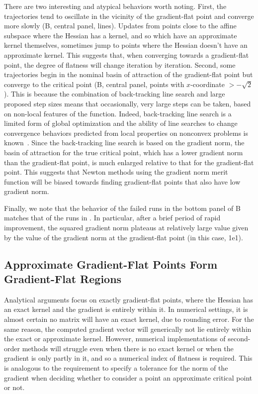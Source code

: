 \documentclass[../../thesis.tex]{subfiles}
\begin{document}
There are two interesting and atypical behaviors worth noting.
First, the trajectories tend to oscillate
in the vicinity of the gradient-flat point
and converge more slowly
(B, central panel, \failcolor{} lines).
Updates from points close to the affine subspace where the Hessian has a kernel,
and so which have an approximate kernel themselves,
sometimes jump to points where the Hessian doesn't have an approximate kernel.
This suggests that, when converging towards a gradient-flat point,
the degree of flatness will change iteration by iteration.
Second, some trajectories begin in the nominal basin
of attraction of the gradient-flat point
but converge to the critical point
(B, central panel, \successcolor{} points
with $x$-coordinate $>-\sqrt{2}$).
This is because the combination of back-tracking line search
and large proposed step sizes means that occasionally,
very large steps can be taken, based on non-local features of the function.
Indeed,
back-tracking line search is a limited form of global optimization
and the ability of line searches
to change convergence behaviors predicted from local properties
on nonconvex problems
is known~\cite{nocedal2006}.
Since the back-tracking line search is based on the gradient norm,
the basin of attraction for the true critical point,
which has a lower gradient norm than the gradient-flat point,
is much enlarged relative to that for the gradient-flat point.
This suggests that Newton methods
using the gradient norm merit function will be biased
towards finding gradient-flat points
that also have low gradient norm.

Finally, we note that the behavior of the failed runs
in the bottom panel of B
matches that of the runs in .
In particular, after a brief period of rapid improvement,
the squared gradient norm plateaus at relatively large value
given by the value of the gradient norm at the gradient-flat point
(in this case, 1e1).

\subsection{Approximate Gradient-Flat Points Form Gradient-Flat Regions}%
Analytical arguments focus on exactly gradient-flat points,
where the Hessian has an exact kernel
and the gradient is entirely within it.
In numerical settings,
it is almost certain no matrix will have an exact kernel,
due to rounding error.
For the same reason, the computed gradient vector will generically not lie entirely
within the exact or approximate kernel.
However, numerical implementations of second-order methods
will struggle even when there is no exact kernel
or when the gradient is only partly in it,
and so a numerical index of flatness is required.
This is analogous to the requirement to specify a tolerance
for the norm of the gradient when deciding whether to consider a point
an approximate critical point or not.
\end{document}
